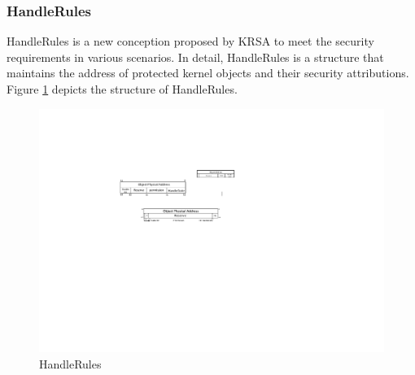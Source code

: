 \documentclass[conference]{IEEEtran}
\begin{document}
\subsubsection{HandleRules}
HandleRules is a new conception proposed by KRSA to meet the security requirements in various scenarios. In detail, HandleRules is a structure that maintains the address of protected kernel objects and their security attributions. Figure \ref{rulefigure} depicts the structure of HandleRules.


\begin{figure}
    \centering
    \includegraphics[scale=0.5]{pic/handlerules.pdf}
    \caption{HandleRules}
    \label{rulefigure}
\end{figure}
\end{document}
